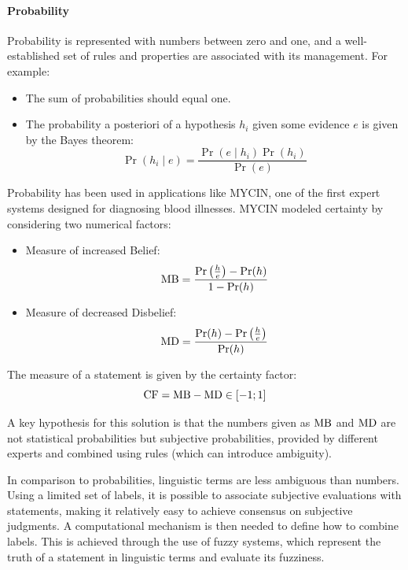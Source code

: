 \paragraph*{Probability}
Probability is represented with numbers between zero and one, and a well-established set of rules and properties are associated with its management. For example:
\begin{itemize}
    \item The sum of probabilities should equal one.
    \item The probability a posteriori of a hypothesis $h_i$ given some evidence $e$ is given by the Bayes theorem:
        \[\Pr(h_i \mid e)=\dfrac{\Pr(e \mid h_i)\Pr(h_i)}{\Pr(e)}\]
\end{itemize}

Probability has been used in applications like MYCIN, one of the first expert systems designed for diagnosing blood illnesses. 
MYCIN modeled certainty by considering two numerical factors:
\begin{itemize}
    \item Measure of increased Belief: 
        \[\textnormal{MB}=\dfrac{\Pr\left(\frac{h}{e}\right)-\Pr(h)}{1-\Pr(h)}\]
    \item Measure of decreased Disbelief: 
        \[\textnormal{MD}=\dfrac{\Pr(h)-\Pr\left(\frac{h}{e}\right)}{\Pr(h)}\]
\end{itemize}
The measure of a statement is given by the certainty factor:
\[\textnormal{CF}=\textnormal{MB}-\textnormal{MD} \in [-1;1]\]

A key hypothesis for this solution is that the numbers given as $\textnormal{MB}$ and $\textnormal{MD}$ are not statistical probabilities but subjective probabilities, provided by different experts and combined using rules (which can introduce ambiguity).

In comparison to probabilities, linguistic terms are less ambiguous than numbers. 
Using a limited set of labels, it is possible to associate subjective evaluations with statements, making it relatively easy to achieve consensus on subjective judgments. 
A computational mechanism is then needed to define how to combine labels. 
This is achieved through the use of fuzzy systems, which represent the truth of a statement in linguistic terms and evaluate its fuzziness.
